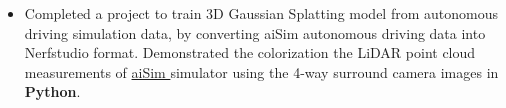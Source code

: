 \documentclass[a4paper,11pt]{article}
\newcommand{\linkicon}{{\footnotesize\faExternalLink*}}
\begin{document}
\begin{itemize}[nosep,after=\strut,leftmargin=1em,itemsep=3pt,label=--]

  \item Completed a project to train 3D Gaussian Splatting model from autonomous driving simulation data, by converting aiSim autonomous driving data into Nerfstudio format. Demonstrated the colorization the LiDAR point cloud measurements of \href{https://aimotive.com/aisim}{aiSim \linkicon} simulator using the 4-way surround camera images in \textbf{Python}.  
  


\end{itemize}



\end{document}
